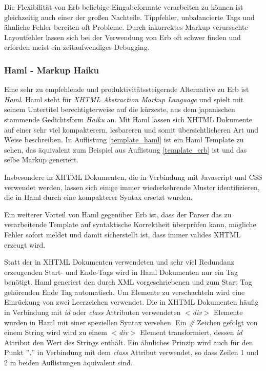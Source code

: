

Die Flexibilität von Erb beliebige Eingabeformate verarbeiten zu
können ist gleichzeitig auch einer der großen Nachteile. Tippfehler,
unbalancierte Tags und ähnliche Fehler bereiten oft Probleme. Durch
inkorrektes Markup verursachte Layoutfehler lassen sich bei der
Verwendung von Erb oft schwer finden und erforden meist ein
zeitaufwendiges Debugging.

\subsubsection{Haml - Markup Haiku}

Eine sehr zu empfehlende und produktivitätssteigernde Alternative zu
Erb ist \textit{Haml}. Haml steht für \textit{XHTML Abstraction Markup
  Language} und spielt mit seinem Untertitel berechtigterweise auf die
kürzeste, aus dem japanischen stammende Gedichtsform \textit{Haiku}
an. Mit Haml lassen sich XHTML Dokumente auf einer sehr viel
kompakterern, lesbareren und somit übersichtlicheren Art und Weise
beschreiben. In Auflistung \ref{template_haml} ist ein Haml Template
zu sehen, das äquivalent zum Beispiel aus Auflistung
\ref{template_erb} ist und das selbe Markup generiert.



Insbesondere in XHTML Dokumenten, die in Verbindung mit Javascript und
CSS verwendet werden, lassen sich einige immer wiederkehrende Muster
identifizieren, die in Haml durch eine kompakterer Syntax ersetzt
wurden.

Ein weiterer Vorteil von Haml gegenüber Erb ist, dass der Parser das
zu verarbeitende Template auf syntaktische Korrektheit überprüfen
kann, mögliche Fehler sofort meldet und damit sicherstellt ist, dass
immer valides XHTML erzeugt wird.

Statt der in XHTML Dokumenten verwendeten und sehr viel Redundanz
erzeugenden Start- und Ende-Tags wird in Haml Dokumenten nur ein Tag
benötigt. Haml generiert den durch XML  vorgeschriebenen und zum Start Tag gehörenden Ende
Tag automatisch. Um Elemente zu verschachteln wird eine Einrückung von
zwei Leerzeichen verwendet. Die in XHTML Dokumenten häufig in
Verbindung mit \textit{id} oder \textit{class} Attributen verwendeten
\textit{$<$div$>$} Elemente wurden in Haml mit einer speziellen Syntax
versehen. Ein \textit{\#} Zeichen gefolgt von einem String wird wird
zu einem \textit{$<$div$>$} Element transformiert, dessen \textit{id}
Attribut den Wert des Strings enthält. Ein ähnliches Prinzip wird auch
für den Punkt ''\textit{.}''  in Verbindung mit dem \textit{class}
Attribut verwendet, so dass Zeilen 1 und 2 in beiden Auflistungen
äquivalent sind.

